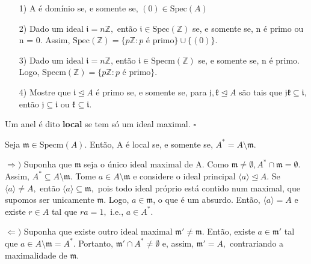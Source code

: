 \documentclass[algebraII_notes.tex]{subfiles}
\begin{document}
\begin{prop*}[Exercício]
	\begin{itemize}
		\item[1)] A é domínio se, e somente se, \((0)\in \mathrm{Spec}(A)\)
		\item[2)] Dado um ideal \(\mathfrak{i} = n \mathbb{Z},\) então \(\mathfrak{i}\in \mathrm{Spec}(\mathbb{Z})\) se, e somente se,
		      n é primo ou n = 0. Assim, \(\mathrm{Spec}(\mathbb{Z}) = \{p \mathbb{Z}: p \text{ é primo}\}\cup \{(0)\}\).
		\item[3)] Dado um ideal \(\mathfrak{i} = n \mathbb{Z}\), então \(\mathfrak{i}\in \mathrm{Specm}(\mathbb{Z})\) se, e somente se,
		      n é primo. Logo, \(\mathrm{Specm}(\mathbb{Z}) = \{p \mathbb{Z}:p \text{ é primo}\}\).
		\item[4)] Mostre que \(\mathfrak{i}\trianglelefteq A\) é primo se, e somente se, para \(\mathfrak{j}, \mathfrak{k}\trianglelefteq A\) são tais que \(\mathfrak{j}\mathfrak{k}\subseteq \mathfrak{i}\), então
		      \(\mathfrak{j}\subseteq \mathfrak{i}\) ou \(\mathfrak{k}\subseteq \mathfrak{i}\).
	\end{itemize}
\end{prop*}
\begin{def*}
	Um anel é dito \textbf{local} se tem só um ideal maximal. \(\square\)
\end{def*}
\begin{lemma*}
	Seja \(\mathfrak{m}\in \mathrm{Specm}(A)\). Então, A é local se, e somente se, \(A^{*} = A\setminus{\mathfrak{m}}\).
\end{lemma*}
\begin{proof*}
	\(\Rightarrow )\) Suponha que \(\mathfrak{m}\) seja o único ideal maximal de A. Como \(\mathfrak{m} \neq\emptyset, A^{*}\cap \mathfrak{m} = \emptyset\).
	Assim, \(A^{*}\subseteq{A\setminus{\mathfrak{m}}}.\) Tome \(a\in A\setminus{\mathfrak{m}}\) e considere o ideal principal \(\langle a \rangle \trianglelefteq{A}.\)
	Se \(\langle a \rangle\neq A,\) então \(\langle a \rangle \subseteq{\mathfrak{m}},\) pois todo ideal próprio está contido num maximal, que supomos ser unicamente \(\mathfrak{m}\).
	Logo, \(a\in \mathfrak{m}\), o que é um absurdo. Então, \(\langle a \rangle = A\) e existe \(r\in A\) tal que \(ra = 1,\) i.e., \(a\in A^{*}.\)

	\(\Leftarrow )\) Suponha que existe outro ideal maximal \(\mathfrak{m}'\neq \mathfrak{m}.\) Então, existe \(a\in \mathfrak{m}'\)
	tal que \(a\in A\setminus{\mathfrak{m}} = A^{*}.\) Portanto, \(\mathfrak{m}'\cap A^{*} \neq\emptyset\) e, assim, \(\mathfrak{m}' = A,\)
	contrariando a maximalidade de \(\mathfrak{m}.\) \qedsymbol
\end{proof*}
\end{document}

